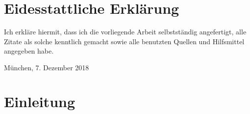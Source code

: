 \documentclass[11pt,a4paper,twoside]{article}
\title{}
\author{}
\date{}
\begin{document}


\cleardoublepage



\cleardoublepage


\section*{Eidesstattliche Erklärung}


\noindent Ich erkläre hiermit, dass ich die vorliegende Arbeit
selbstständig angefertigt, alle Zitate als solche kenntlich gemacht
sowie alle benutzten Quellen und Hilfsmittel angegeben habe.

\vspace{7ex}
\noindent\makebox[9.3cm]{\dotfill}

\smallskip\noindent München, 7. Dezember 2018


\cleardoublepage




\cleardoublepage



\cleardoublepage
\cleardoublepage

\pagestyle{fancy}
\setcounter{page}{1}

{
\setcounter{tocdepth}{3}
\tableofcontents
}
\cleardoublepage

\setcounter{page}{1}

\fancyhead[LE,RO]{\rightmark}
\fancyhead[LO,RE]{\leftmark}
\fancyfoot[LE,RO]{\thepage}

\cleardoublepage

\hypertarget{einleitung}{%
\section{Einleitung}\label{einleitung}}

\vspace{1.5cm}
\end{document}
